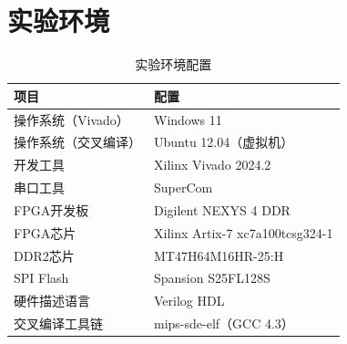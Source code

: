 \section{实验环境}

\begin{table}[H]
    \centering
    \caption{实验环境配置}
    \begin{tabular}{ll}
        \toprule
        \textbf{项目} & \textbf{配置} \\
        \midrule
        操作系统（Vivado） & Windows 11 \\
        操作系统（交叉编译） & Ubuntu 12.04（虚拟机） \\
        开发工具 & Xilinx Vivado 2024.2 \\
        串口工具 & SuperCom \\
        FPGA开发板 & Digilent NEXYS 4 DDR \\
        FPGA芯片 & Xilinx Artix-7 xc7a100tcsg324-1 \\
        DDR2芯片 & MT47H64M16HR-25:H \\
        SPI Flash & Spansion S25FL128S \\
        硬件描述语言 & Verilog HDL \\
        交叉编译工具链 & mips-sde-elf（GCC 4.3） \\
        \bottomrule
    \end{tabular}
\end{table}
